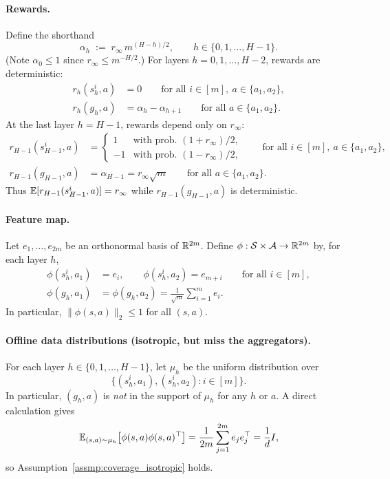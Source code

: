 \paragraph{Rewards.}
Define the shorthand
\[
\alpha_h \;:=\; r_\infty\, m^{(H-h)/2},
\qquad h\in\{0,1,\dots,H-1\}.
\]
(Note $\alpha_0\le 1$ since $r_\infty\le m^{-H/2}$.)  For layers $h=0,1,\dots,H-2$,
rewards are deterministic:
\begin{align*}
r_h(s_h^i,a) &= 0
\qquad\text{for all } i\in[m],\ a\in\{a_1,a_2\},\\
r_h(g_h,a) &= \alpha_h - \alpha_{h+1}
\qquad\text{for all } a\in\{a_1,a_2\}.
\end{align*}
At the last layer $h=H-1$, rewards depend only on $r_\infty$:
\begin{align*}
r_{H-1}(s_{H-1}^i,a) &=
\begin{cases}
1 & \text{with prob. } (1+r_\infty)/2,\\
-1 & \text{with prob. } (1-r_\infty)/2,
\end{cases}
\qquad\text{for all } i\in[m],\ a\in\{a_1,a_2\},\\
r_{H-1}(g_{H-1},a) &= \alpha_{H-1}=r_\infty\sqrt{m}
\qquad\text{for all } a\in\{a_1,a_2\}.
\end{align*}
Thus $\mathbb{E}[r_{H-1}(s_{H-1}^i,a)]=r_\infty$ while $r_{H-1}(g_{H-1},a)$ is deterministic.

\paragraph{Feature map.}
Let $e_1,\dots,e_{2m}$ be an orthonormal basis of $\mathbb{R}^{2m}$.  Define
$\phi:\mathcal{S}\times\mathcal{A}\to\mathbb{R}^{2m}$ by, for each layer $h$,
\begin{align*}
\phi(s_h^i,a_1) &= e_i, \qquad
\phi(s_h^i,a_2) = e_{m+i} \qquad\text{for all } i\in[m],\\
\phi(g_h,a_1) &= \phi(g_h,a_2) = \frac{1}{\sqrt{m}}\sum_{i=1}^m e_i.
\end{align*}
In particular, $\|\phi(s,a)\|_2\le 1$ for all $(s,a)$.

\paragraph{Offline data distributions (isotropic, but miss the aggregators).}
For each layer $h\in\{0,1,\dots,H-1\}$, let $\mu_h$ be the uniform distribution over
\[
\{(s_h^i,a_1),(s_h^i,a_2): i\in[m]\}.
\]
In particular, $(g_h,a)$ is \emph{not} in the support of $\mu_h$ for any $h$ or $a$.
A direct calculation gives
\[
\mathbb{E}_{(s,a)\sim\mu_h}\big[\phi(s,a)\phi(s,a)^\top\big]
= \frac{1}{2m}\sum_{j=1}^{2m} e_j e_j^\top
= \frac{1}{d}I,
\]
so Assumption~\ref{assmp:coverage_isotropic} holds.

